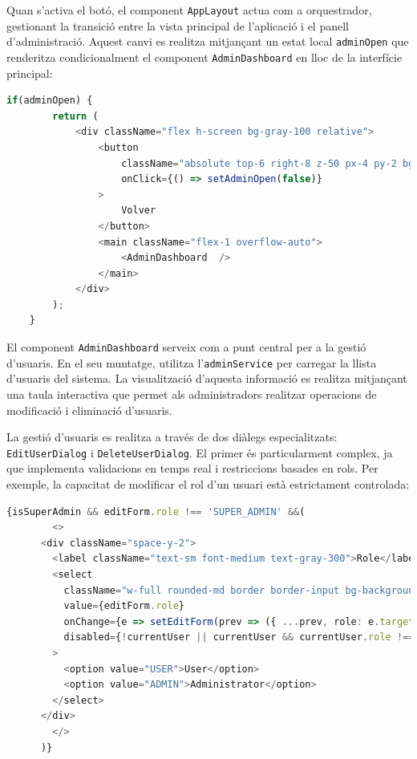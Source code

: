 Quan s'activa el botó, el component \texttt{AppLayout} actua com a orquestrador, gestionant la transició entre la vista principal de l'aplicació i el panell d'administració. Aquest canvi es realitza mitjançant un estat local \texttt{adminOpen} que renderitza condicionalment el component \texttt{AdminDashboard} en lloc de la interfície principal:

\begin{lstlisting}[language=typescript, caption={Renderitzat condicional del panell d'administració a `AppLayout`}]
    if(adminOpen) {
		return (
			<div className="flex h-screen bg-gray-100 relative">
				<button
					className="absolute top-6 right-8 z-50 px-4 py-2 bg-indigo-600 text-white rounded-lg shadow hover:bg-indigo-700 transition-colors font-semibold"
					onClick={() => setAdminOpen(false)}
				>
					Volver
				</button>
				<main className="flex-1 overflow-auto">
					<AdminDashboard  />
				</main>
			</div>
		);
	}
\end{lstlisting}

El component \texttt{AdminDashboard} serveix com a punt central per a la gestió d'usuaris. En el seu muntatge, utilitza l'\texttt{adminService} per carregar la llista d'usuaris del sistema. La visualització d'aquesta informació es realitza mitjançant una taula interactiva que permet als administradors realitzar operacions de modificació i eliminació d'usuaris.

La gestió d'usuaris es realitza a través de dos diàlegs especialitzats: \texttt{EditUserDialog} i \texttt{DeleteUserDialog}. El primer és particularment complex, ja que implementa validacions en temps real i restriccions basades en rols. Per exemple, la capacitat de modificar el rol d'un usuari està estrictament controlada:

\begin{lstlisting}[language=typescript, caption={Control d'accés per a la modificació de rols}]
    {isSuperAdmin && editForm.role !== 'SUPER_ADMIN' &&(
        <>
      <div className="space-y-2">
        <label className="text-sm font-medium text-gray-300">Role</label>
        <select
          className="w-full rounded-md border border-input bg-background px-3 py-2"
          value={editForm.role}
          onChange={e => setEditForm(prev => ({ ...prev, role: e.target.value as 'USER' | 'ADMIN' | 'SUPER_ADMIN' }))}
          disabled={!currentUser || currentUser && currentUser.role !== 'SUPER_ADMIN' || (currentUser.role === 'ADMIN' && user.role === 'ADMIN')}
        >
          <option value="USER">User</option>
          <option value="ADMIN">Administrator</option>
        </select>
      </div>
        </>
      )}
\end{lstlisting}

